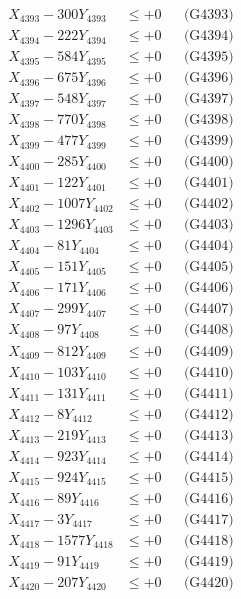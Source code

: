 \documentclass[a4paper,10pt]{article}
\begin{document}
{\begin{align}
X_{4393} - 300Y_{4393} &\leq +0 && \text{(G4393)} \\
X_{4394} - 222Y_{4394} &\leq +0 && \text{(G4394)} \\
X_{4395} - 584Y_{4395} &\leq +0 && \text{(G4395)} \\
X_{4396} - 675Y_{4396} &\leq +0 && \text{(G4396)} \\
X_{4397} - 548Y_{4397} &\leq +0 && \text{(G4397)} \\
X_{4398} - 770Y_{4398} &\leq +0 && \text{(G4398)} \\
X_{4399} - 477Y_{4399} &\leq +0 && \text{(G4399)} \\
X_{4400} - 285Y_{4400} &\leq +0 && \text{(G4400)} \\
\allowbreak
X_{4401} - 122Y_{4401} &\leq +0 && \text{(G4401)} \\
X_{4402} - 1007Y_{4402} &\leq +0 && \text{(G4402)} \\
X_{4403} - 1296Y_{4403} &\leq +0 && \text{(G4403)} \\
X_{4404} - 81Y_{4404} &\leq +0 && \text{(G4404)} \\
X_{4405} - 151Y_{4405} &\leq +0 && \text{(G4405)} \\
X_{4406} - 171Y_{4406} &\leq +0 && \text{(G4406)} \\
X_{4407} - 299Y_{4407} &\leq +0 && \text{(G4407)} \\
X_{4408} - 97Y_{4408} &\leq +0 && \text{(G4408)} \\
X_{4409} - 812Y_{4409} &\leq +0 && \text{(G4409)} \\
X_{4410} - 103Y_{4410} &\leq +0 && \text{(G4410)} \\
\allowbreak
X_{4411} - 131Y_{4411} &\leq +0 && \text{(G4411)} \\
X_{4412} - 8Y_{4412} &\leq +0 && \text{(G4412)} \\
X_{4413} - 219Y_{4413} &\leq +0 && \text{(G4413)} \\
X_{4414} - 923Y_{4414} &\leq +0 && \text{(G4414)} \\
X_{4415} - 924Y_{4415} &\leq +0 && \text{(G4415)} \\
X_{4416} - 89Y_{4416} &\leq +0 && \text{(G4416)} \\
X_{4417} - 3Y_{4417} &\leq +0 && \text{(G4417)} \\
X_{4418} - 1577Y_{4418} &\leq +0 && \text{(G4418)} \\
X_{4419} - 91Y_{4419} &\leq +0 && \text{(G4419)} \\
X_{4420} - 207Y_{4420} &\leq +0 && \text{(G4420)} \\

\end{align}}
\end{document}
